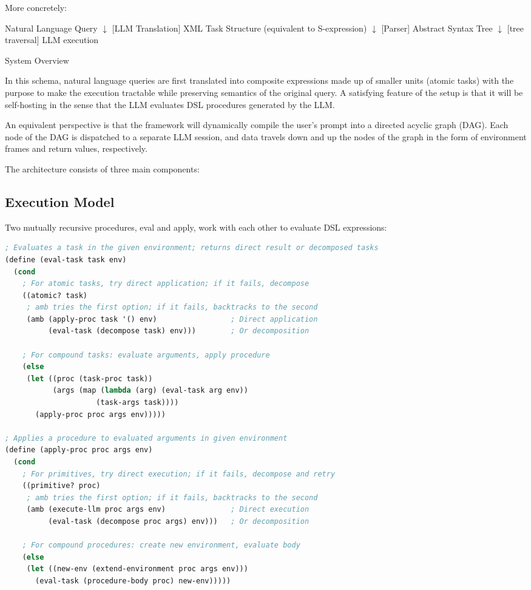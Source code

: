 \documentclass{article}
\begin{document}
More concretely:

\begin{algorithm}[H]
\SetAlgoLined
{}
Natural Language Query\;
$\downarrow$ [LLM Translation]\;
XML Task Structure (equivalent to S-expression)\;
$\downarrow$ [Parser]\;
Abstract Syntax Tree\;
$\downarrow$ [tree traversal]\;
LLM execution\;
\caption{System Overview}
\end{algorithm}

In this schema, natural language queries are first translated into composite expressions made up of smaller units (atomic tasks) with the purpose to make the execution tractable while preserving semantics of the original query. A satisfying feature of the setup is that it will be self-hosting in the sense that the LLM evaluates DSL procedures generated by the LLM.

An equivalent perspective is that the framework will dynamically compile the user's prompt into a directed acyclic graph (DAG). Each node of the DAG is dispatched to a separate LLM session, and data travels down and up the nodes of the graph in the form of environment frames and return values, respectively. 

The architecture consists of three main components:

\newpage
\subsection{Execution Model}
Two mutually recursive procedures, eval and apply, work with each other to evaluate DSL expressions:


\begin{lstlisting}[language=Scheme, caption = Scheme sketch of the evaluation procedure]
; Evaluates a task in the given environment; returns direct result or decomposed tasks
(define (eval-task task env)
  (cond 
    ; For atomic tasks, try direct application; if it fails, decompose
    ((atomic? task)
     ; amb tries the first option; if it fails, backtracks to the second
     (amb (apply-proc task '() env)                 ; Direct application
          (eval-task (decompose task) env)))        ; Or decomposition
    
    ; For compound tasks: evaluate arguments, apply procedure
    (else 
     (let ((proc (task-proc task))
           (args (map (lambda (arg) (eval-task arg env))
                     (task-args task))))
       (apply-proc proc args env)))))

; Applies a procedure to evaluated arguments in given environment
(define (apply-proc proc args env)
  (cond
    ; For primitives, try direct execution; if it fails, decompose and retry
    ((primitive? proc)
     ; amb tries the first option; if it fails, backtracks to the second
     (amb (execute-llm proc args env)               ; Direct execution
          (eval-task (decompose proc args) env)))   ; Or decomposition
    
    ; For compound procedures: create new environment, evaluate body
    (else
     (let ((new-env (extend-environment proc args env)))
       (eval-task (procedure-body proc) new-env)))))
\end{lstlisting}
\end{document}
